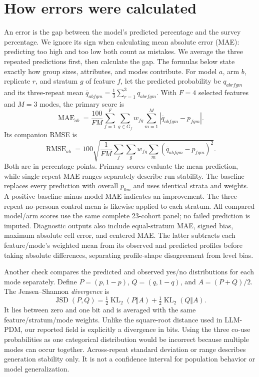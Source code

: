 \documentclass{article}
\begin{document}
\section{How errors were calculated}
An error is the gap between the model's predicted percentage and the survey percentage. We ignore its sign when calculating mean absolute error (MAE): predicting too high and too low both count as mistakes. We average the three repeated predictions first, then calculate the gap. The formulas below state exactly how group sizes, attributes, and modes contribute.
For model $a$, arm $b$, replicate $r$, and stratum $g$ of feature $f$, let the predicted probability be $q_{abrfgm}$ and its three-repeat mean $\bar q_{abfgm}=\frac13\sum_{r=1}^{3}q_{abrfgm}$. With $F=4$ selected features and $M=3$ modes, the primary score is
\begin{equation}
\operatorname{MAE}_{ab}=\frac{100}{FM}\sum_{f=1}^{F}\sum_{g\in G_f}w_{fg}\sum_{m=1}^{M}\left|\bar q_{abfgm}-p_{fgm}\right|.
\end{equation}
Its companion RMSE is
\begin{equation}
\operatorname{RMSE}_{ab}=100\sqrt{\frac{1}{FM}\sum_f\sum_gw_{fg}\sum_m(\bar q_{abfgm}-p_{fgm})^2}.
\end{equation}
Both are in percentage points. Primary scores evaluate the mean prediction, while single-repeat MAE ranges separately describe run stability. The baseline replaces every prediction with overall $p_{0m}$ and uses identical strata and weights. A positive baseline-minus-model MAE indicates an improvement. The three-repeat no-persona control mean is likewise applied to each stratum. All compared model/arm scores use the same complete 23-cohort panel; no failed prediction is imputed. Diagnostic outputs also include equal-stratum MAE, signed bias, maximum absolute cell error, and centered MAE. The latter subtracts each feature/mode's weighted mean from its observed and predicted profiles before taking absolute differences, separating profile-shape disagreement from level bias.

Another check compares the predicted and observed yes/no distributions for each mode separately. Define $P=(p,1-p)$, $Q=(q,1-q)$, and $A=(P+Q)/2$. The Jensen--Shannon \emph{divergence} is
\begin{equation}
\operatorname{JSD}(P,Q)=\tfrac12\operatorname{KL}_2(P\Vert A)+\tfrac12\operatorname{KL}_2(Q\Vert A).
\end{equation}
It lies between zero and one bit and is averaged with the same feature/stratum/mode weights. Unlike the square-root distance used in LLM-PDM, our reported field is explicitly a divergence in bits. Using the three co-use probabilities as one categorical distribution would be incorrect because multiple modes can occur together. Across-repeat standard deviation or range describes generation stability only. It is not a confidence interval for population behavior or model generalization.
\end{document}
